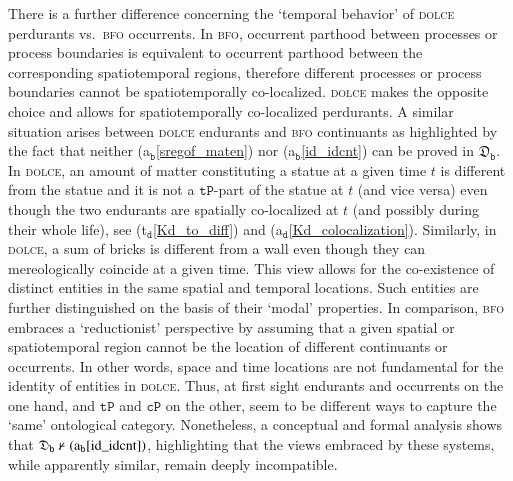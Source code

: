 \documentclass[ao]{iosart2x}
\newcommand{\nb}[1]{\textcolor{red}{$|$}\marginpar{\hspace*{-0cm}\parbox{20mm}{\scriptsize\raggedright\textcolor{red}{#1}}}}
\newcommand{\bfoAxLabel}{\textrm{a$_\texttt{b}$}}
\newcommand{\dolceAxLabel}{\textrm{a$_\texttt{d}$}}
\newcommand{\dolceThrLabel}{\textrm{t$_\texttt{d}$}}
\newcommand{\dbThrLabel}{\textrm{t$_\texttt{db}$}}
\newcommand{\refdolceax}[1]{({\dolceAxLabel}\ref{#1})}
\newcommand{\refdolceth}[1]{({\dolceThrLabel}\ref{#1})}
\newcommand{\refbfoax}[1]{({\bfoAxLabel}\ref{#1})}
\newcommand{\refdbth}[1]{({\dbThrLabel}\ref{#1})}
\newcommand{\pr}[1]{\mathtt{#1}}
\newcommand{\dolce}{{\textsc{dolce}}}
\newcommand{\bfo}{{\textsc{bfo}}}
\newcommand {\thdolcedbmap} {\ensuremath{\mathfrak{D}_\texttt{b}}}
\newcommand {\TPd} {\ensuremath{\pr{tP}}}
\newcommand{\bfocpart}{\pr{cP}}
\newcommand{\bfostregof}{\pr{STREG}}
\begin{document}
There is a further difference concerning the `temporal behavior' of {\dolce} perdurants vs.~{\bfo} occurrents. %
In {\bfo}, occurrent parthood between processes or process boundaries is equivalent to occurrent parthood between the corresponding spatiotemporal regions, therefore different processes or process boundaries cannot be spatiotemporally co-localized. %
{\dolce} makes the opposite choice and allows for spatiotemporally co-localized perdurants. A similar situation arises between {\dolce} endurants and {\bfo} continuants as highlighted by the fact that neither \refbfoax{sregof_maten} nor \refbfoax{id_idcnt} can be proved in $\thdolcedbmap$. %
In {\dolce}, an amount of matter constituting a statue at a given time $t$ is different from the statue and it is not a $\TPd$-part of the statue at $t$ (and vice versa) even though the two endurants are spatially co-localized at $t$ (and possibly during their whole life), see \refdolceth{Kd_to_diff} and \refdolceax{Kd_colocalization}. Similarly, in {\dolce}, a sum of bricks is different from a wall even though they can mereologically coincide at a given time.
This view allows for the co-existence of distinct entities in the same spatial and temporal locations. Such entities are further distinguished on the basis of their `modal' properties. In comparison, {\bfo} embraces a `reductionist' perspective by assuming that a given spatial or spatiotemporal region cannot be the location of different continuants or occurrents. In other words, space and time locations are not fundamental for the identity of entities in {\dolce}. %
Thus, at first sight endurants and occurrents on the one hand, and $\TPd$ and $\bfocpart$ on the other, seem to be different ways to capture the `same' ontological category. Nonetheless, a conceptual and formal analysis shows that ${\thdolcedbmap \nvdash \refbfoax{id_idcnt}}$, highlighting that the views embraced by these systems, while apparently similar, remain deeply incompatible. %
\end{document}
